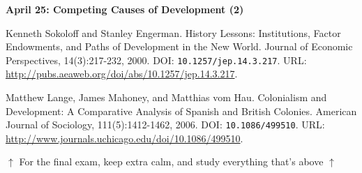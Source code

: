\documentclass[letterpaper]{article}
\renewenvironment{itemize}{
  \begin{list}{}{
    \setlength{\leftmargin}{1.5em}
  }
}{
  \end{list}
}
\begin{document}
\begin{enumerate}
\begin{itemize}
		\item {\bf April 25: Competing Causes of Development (2)}
			\begin{itemize}
				\item[$\bullet$] Kenneth Sokoloff and Stanley Engerman. History Lessons: Institutions, Factor Endowments, and Paths of Development in the New World. Journal of Economic Perspectives, 14(3):217-232, 2000. DOI: \texttt{10.1257/jep.14.3.217}. URL: \url{http://pubs.aeaweb.org/doi/abs/10.1257/jep.14.3.217}.
				\item[$\bullet$] Matthew Lange, James Mahoney, and Matthias vom Hau. Colonialism and Development: A Comparative Analysis of Spanish and British Colonies. American Journal of Sociology, 111(5):1412-1462, 2006. DOI: \texttt{10.1086/499510}. URL: \url{http://www.journals.uchicago.edu/doi/10.1086/499510}.
		\end{itemize}
	\end{itemize}
  


\vspace{2mm}

	\begin{center}$\uparrow$ {\color{blue}For the final exam, keep extra calm, and study everything that's above} $\uparrow$\end{center}
	\begin{center}\Smiley{}\end{center}

\vspace{2mm}



\end{enumerate}
\end{document}
